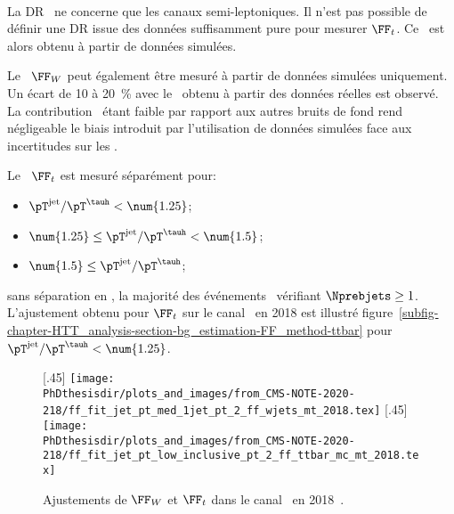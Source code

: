 \paragraph{\ttbar}
La DR \ttbar\ ne concerne que les canaux semi-leptoniques.
Il n'est pas possible de définir une DR issue des données suffisamment pure pour mesurer $\FF_t$.
Ce \fakefactor\ est alors obtenu à partir de données simulées.
\par
Le \fakefactor\ $\FF_W$ peut également être mesuré à partir de données simulées uniquement.
Un écart de \num{10} à \SI{20}{\%} avec le \fakefactor\ obtenu à partir des données réelles est observé.
La contribution \ttbar\ étant faible par rapport aux autres bruits de fond rend négligeable le biais introduit par l'utilisation de données simulées face aux incertitudes sur les \fakefactors.
\par
Le \fakefactor\ $\FF_t$ est mesuré séparément pour:
\begin{itemize}
\item $\pT^\text{jet}/\pT^{\tauh} < \num{1.25}$;
\item $\num{1.25} \leq \pT^\text{jet}/\pT^{\tauh} < \num{1.5}$;
\item $\num{1.5} \leq \pT^\text{jet}/\pT^{\tauh}$;
\end{itemize}
sans séparation en \Nprebjets, la majorité des événements \ttbar\ vérifiant $\Nprebjets\geq1$.
L'ajustement obtenu pour $\FF_t$ sur le canal \mu\tauh\ en 2018 est illustré figure~\ref{subfig-chapter-HTT_analysis-section-bg_estimation-FF_method-ttbar} pour $\pT^\text{jet}/\pT^{\tauh} < \num{1.25}$.
\begin{figure}[h]
\centering

[.45\textwidth]
{\texttt{[image: \\PhDthesisdir/plots\_and\_images/from\_CMS-NOTE-2020-218/ff\_fit\_jet\_pt\_med\_1jet\_pt\_2\_ff\_wjets\_mt\_2018.tex]}}
\hfill
{}[.45\textwidth]
{\texttt{[image: \\PhDthesisdir/plots\_and\_images/from\_CMS-NOTE-2020-218/ff\_fit\_jet\_pt\_low\_inclusive\_pt\_2\_ff\_ttbar\_mc\_mt\_2018.tex]}}

\caption[Ajustements de $\FF_W$ et $\FF_t$ dans le canal \mu\tauh\ en 2018.]{Ajustements de $\FF_W$ et $\FF_t$ dans le canal \mu\tauh\ en 2018~\cite{CMS-NOTE-2020-218}.}
\label{fig-chapter-HTT_analysis-section-bg_estimation-FF_method-WJ-ttbar}
\end{figure}

